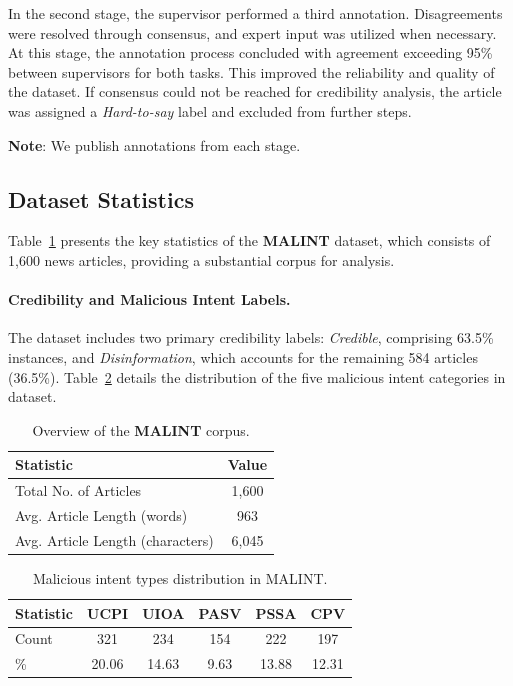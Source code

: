 \documentclass[11pt]{article}
\begin{document}
In the second stage, the supervisor performed a third annotation. Disagreements were resolved through consensus, and expert input was utilized when necessary. At this stage, the annotation process concluded with agreement exceeding 95\% between supervisors for both tasks. This improved the reliability and quality of the dataset. If consensus could not be reached for credibility analysis, the article was assigned a \textit{Hard-to-say} label and excluded from further steps.

\noindent\textbf{Note}: We publish annotations from each stage.

\subsection{Dataset Statistics}\label{ssec:malint_stats}

Table~\ref{tab:malint_overview} presents the key statistics of the \textbf{MALINT} dataset, which consists of 1,600 news articles, providing a substantial corpus for analysis.

\paragraph{Credibility and Malicious Intent Labels.}
The dataset includes two primary credibility labels: \textit{Credible}, comprising 63.5\% instances, and \textit{Disinformation}, which accounts for the remaining 584 articles (36.5\%).
Table~\ref{tab:intent_distribution} details the distribution of the five malicious intent categories in dataset. 

\begin{table}[ht]
\centering
\scriptsize
\begin{tabular}{@{}l c@{}}
\toprule
\textbf{Statistic} & \textbf{Value} \\
\midrule
Total No. of Articles & 1{,}600 \\
Avg. Article Length (words) & 963 \\
Avg. Article Length (characters) & 6{,}045 \\
\bottomrule
\end{tabular}
\caption{Overview of the \textbf{MALINT} corpus.}
\label{tab:malint_overview}
\end{table}

\begin{table}[ht]
\centering
\scriptsize
\begin{tabular}{@{}l c c c c c@{}}
\toprule
\textbf{Statistic} & \textbf{UCPI} & \textbf{UIOA} &  \textbf{PASV} & \textbf{PSSA} & \textbf{CPV}  \\
\midrule
Count & 321 & 234 & 154 & 222 & 197 \\
\% & 20.06 & 14.63 & 9.63 & 13.88 & 12.31 \\
\bottomrule
\end{tabular}
\caption{Malicious intent types distribution in MALINT.}
\label{tab:intent_distribution}
\end{table}
\end{document}
